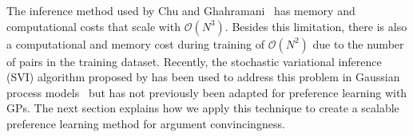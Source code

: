 
The inference method used by Chu and Ghahramani~%
has memory and computational costs that scale with $\mathcal{O}(N^3)$. %
Besides this limitation, there is also a computational and memory cost 
during training of $\mathcal{O}(N^2)$ due to the number of pairs in the training dataset.
Recently, the stochastic variational inference (SVI) algorithm proposed by \cite{hoffman2013stochastic} 
has been used to address this problem in Gaussian process models~\cite{hensman2013gaussian,hensman_scalable_2015} 
but has not previously been adapted for preference learning with GPs.
The next section explains how we apply this technique to create a scalable preference learning method for argument convincingness.

